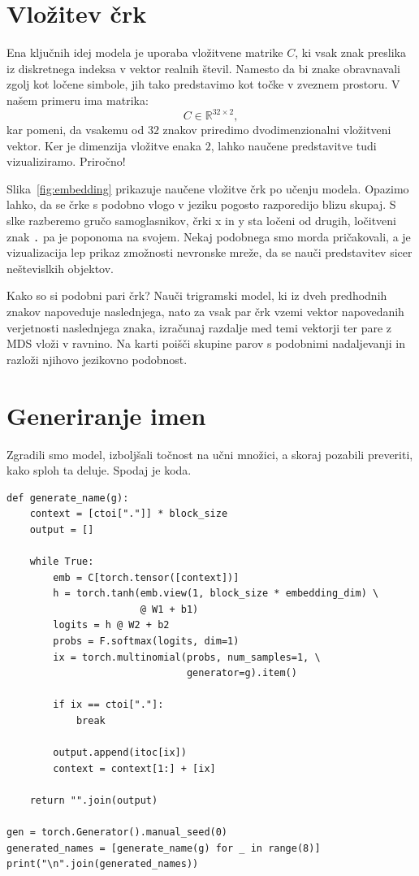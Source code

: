\section{Vložitev črk}

Ena ključnih idej modela je uporaba vložitvene matrike $C$, ki vsak znak preslika iz diskretnega indeksa v vektor realnih števil. Namesto da bi znake obravnavali zgolj kot ločene simbole, jih tako predstavimo kot točke v zveznem prostoru. V našem primeru ima matrika:
\[
C \in \mathbb{R}^{32 \times 2},
\]
kar pomeni, da vsakemu od $32$ znakov priredimo dvodimenzionalni vložitveni vektor. Ker je dimenzija vložitve enaka $2$, lahko naučene predstavitve tudi vizualiziramo. Priročno!

Slika~\ref{fig:embedding} prikazuje naučene vložitve črk po učenju modela. Opazimo lahko, da se črke s podobno vlogo v jeziku pogosto razporedijo blizu skupaj. S slke razberemo gručo samoglasnikov, črki x in y sta ločeni od drugih, ločitveni znak \texttt{.} pa je poponoma na svojem. Nekaj podobnega smo morda pričakovali, a je vizualizacija lep prikaz zmožnosti nevronske mreže, da se nauči predstavitev sicer neštevislkih objektov.

\begin{exercise}{Kako so si podobni pari črk?}
Nauči trigramski model, ki iz dveh predhodnih znakov napoveduje naslednjega,
nato za vsak par črk vzemi vektor napovedanih verjetnosti naslednjega znaka,
izračunaj razdalje med temi vektorji ter pare z MDS vloži v ravnino.
Na karti poišči skupine parov s podobnimi nadaljevanji in razloži
njihovo jezikovno podobnost.
\end{exercise}

\section{Generiranje imen}

Zgradili smo model, izboljšali točnost na učni množici, a skoraj pozabili preveriti, kako sploh ta deluje. Spodaj je koda.

\vspace*{3mm}
\begin{lstlisting}
def generate_name(g):
    context = [ctoi["."]] * block_size
    output = []

    while True:
        emb = C[torch.tensor([context])]
        h = torch.tanh(emb.view(1, block_size * embedding_dim) \
                       @ W1 + b1)
        logits = h @ W2 + b2
        probs = F.softmax(logits, dim=1)
        ix = torch.multinomial(probs, num_samples=1, \
                               generator=g).item()

        if ix == ctoi["."]:
            break

        output.append(itoc[ix])
        context = context[1:] + [ix]

    return "".join(output)

gen = torch.Generator().manual_seed(0)
generated_names = [generate_name(g) for _ in range(8)]
print("\n".join(generated_names))
\end{lstlisting}

